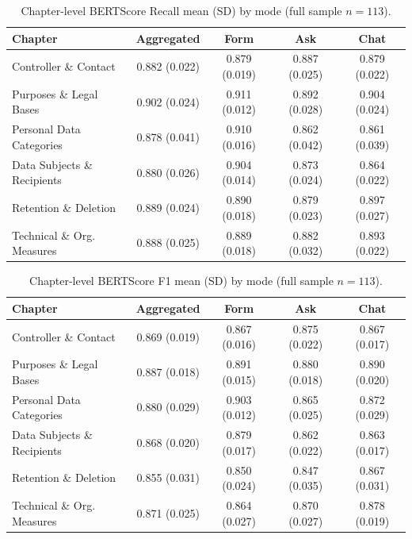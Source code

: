 \begin{table}[H]
\centering
\small
\setlength{\tabcolsep}{4pt}
\begin{tabular}{@{}l c c c c@{}}
\toprule
Chapter & Aggregated & Form & Ask & Chat \\
\midrule
Controller \& Contact         & 0.882 (0.022) & 0.879 (0.019) & 0.887 (0.025) & 0.879 (0.022) \\
Purposes \& Legal Bases       & 0.902 (0.024) & 0.911 (0.012) & 0.892 (0.028) & 0.904 (0.024) \\
Personal Data Categories      & 0.878 (0.041) & 0.910 (0.016) & 0.862 (0.042) & 0.861 (0.039) \\
Data Subjects \& Recipients   & 0.880 (0.026) & 0.904 (0.014) & 0.873 (0.024) & 0.864 (0.022) \\
Retention \& Deletion         & 0.889 (0.024) & 0.890 (0.018) & 0.879 (0.023) & 0.897 (0.027) \\
Technical \& Org. Measures    & 0.888 (0.025) & 0.889 (0.018) & 0.882 (0.032) & 0.893 (0.022) \\
\bottomrule
\end{tabular}
\caption{Chapter-level BERTScore Recall mean (SD) by mode (full
sample $n = 113$).}
\label{tab:nlp-chapter-bertr}
\end{table}

\begin{table}[H]
\centering
\small
\setlength{\tabcolsep}{4pt}
\begin{tabular}{@{}l c c c c@{}}
\toprule
Chapter & Aggregated & Form & Ask & Chat \\
\midrule
Controller \& Contact         & 0.869 (0.019) & 0.867 (0.016) & 0.875 (0.022) & 0.867 (0.017) \\
Purposes \& Legal Bases       & 0.887 (0.018) & 0.891 (0.015) & 0.880 (0.018) & 0.890 (0.020) \\
Personal Data Categories      & 0.880 (0.029) & 0.903 (0.012) & 0.865 (0.025) & 0.872 (0.029) \\
Data Subjects \& Recipients   & 0.868 (0.020) & 0.879 (0.017) & 0.862 (0.022) & 0.863 (0.017) \\
Retention \& Deletion         & 0.855 (0.031) & 0.850 (0.024) & 0.847 (0.035) & 0.867 (0.031) \\
Technical \& Org. Measures    & 0.871 (0.025) & 0.864 (0.027) & 0.870 (0.027) & 0.878 (0.019) \\
\bottomrule
\end{tabular}
\caption{Chapter-level BERTScore F1 mean (SD) by mode (full sample
$n = 113$).}
\label{tab:nlp-chapter-bertf1}
\end{table}

